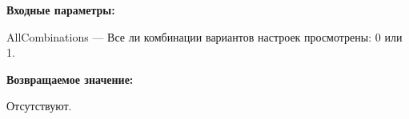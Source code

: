 \textbf{Входные параметры:}

AllCombinations --- Все ли комбинации вариантов настроек просмотрены: 0 или 1.

\textbf{Возвращаемое значение:}

Отсутствуют.